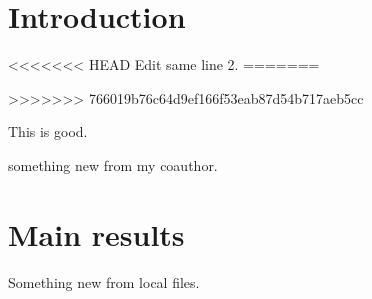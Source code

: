 \documentclass{article}
\begin{document}
\section{Introduction}%
\label{sec:introduction}


<<<<<<< HEAD
Edit same line 2. 
=======

>>>>>>> 766019b76c64d9ef166f53eab87d54b717aeb5cc


This is good. 

something new from my coauthor. 




\section{Main results}%
\label{sec:main_results}

Something new from local files. 
\end{document}
